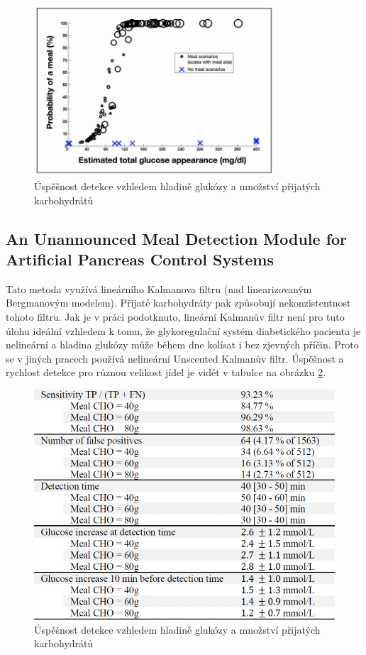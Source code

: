 \begin{figure}[H]
\caption{Úspěšnost detekce vzhledem hladině glukózy a množství přijatých karbohydrátů}
\label{fig:diff2}
\includegraphics[width=0.8\textwidth]{img/analyza/diff2.png}
\end{figure}


\subsection{An Unannounced Meal Detection Module for Artificial Pancreas Control Systems \citep{Analyza.Nekonzistence}}
\label{ch:nekonzistence}

Tato metoda využívá lineárního Kalmanova filtru (nad linearizovaným Bergmanovým modelem). Přijaté karbohydráty pak způsobují nekonzistentnost tohoto filtru. Jak je v práci podotknuto, lineární Kalmanův filtr není pro tuto úlohu ideální vzhledem k tomu, že glykoregulační systém diabetického pacienta je nelineární a hladina glukózy může během dne kolísat i bez zjevných příčin. Proto se v jiných pracech používá nelineární Unscented Kalmanův filtr. Úspěšnost a rychlost detekce pro různou velikost jídel je vidět v tabulce na obrázku \ref{fig:nekonzistence}.

\begin{figure}[H]
\caption{Úspěšnost detekce vzhledem hladině glukózy a množství přijatých karbohydrátů}
\label{fig:nekonzistence}
\includegraphics[width=1\textwidth]{img/analyza/nekonzistence.png}
\end{figure}


